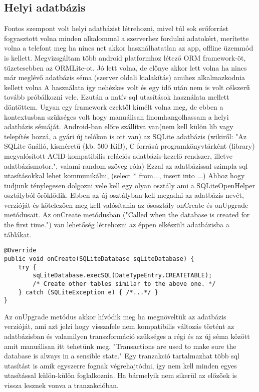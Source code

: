 \subsection*{Helyi adatbázis}
\label{localdatabase}
Fontos szempont volt helyi adatbázist létrehozni, mivel túl sok erőforrást fogyasztott volna minden alkalommal a szerverhez fordulni adatokért, merítette volna a telefont meg ha nincs net akkor használhatatlan az app, offline üzemmód is kellett. 
Megvizsgáltam több android platformhoz létező ORM framework-öt, tüzetesebben az ORMLite-ot. 
Jó lett volna, de előnye akkor lett volna ha nincs már meglévő adatbázis séma (szerver oldali kialakítás) amihez alkalmazkodnia kellett volna
A használata így nehézkes volt és egy idő után nem is volt célszerű tovább próbálkozni vele.
Ezután a natív sql utasítások használata mellett döntöttem. Ugyan egy framework ezektől kímélt volna meg, de ebben a kontextusban szükséges volt hogy manuálisan finomhangolhassam a helyi adatbázis sémáját.
Android-ban előre szállítva van(nem kell külön lib vagy telepítés hozzá, a gyári új telókon is ott van) az SQLite adatbázis (wikiről: "Az SQLite önálló, kisméretű (kb. 500 KiB), C forrású programkönyvtárként (library) megvalósított ACID-kompatibilis relációs adatbázis-kezelő rendszer, illetve adatbázismotor.", valami random szöveg róla)
Ezzal az adatbázissal szimpla sql utasításokkal lehet kommunikálni, (select * from..., insert into ...)
Ahhoz hogy tudjunk ténylegesen dolgozni vele kell egy olyan osztály ami a SQLiteOpenHelper osztályból öröklődik. Ebben az új osztályban kell megadni az adatbázis nevét, verzióját és kötelezően meg kell valósítania az ősosztály onCreate és onUpgrade metódusait.
Az onCreate metódusban ("Called when the database is created for the first time.") van lehetőség létrehozni az éppen elkészült adatbázisba a táblákat. 
\begin{lstlisting}
@Override
public void onCreate(SQLiteDatabase sqLiteDatabase) {
	try {
		sqLiteDatabase.execSQL(DateTypeEntry.CREATETABLE);
		/* Create other tables similar to the above one. */
	} catch (SQLiteException e) { /*...*/ }
}
\end{lstlisting}
Az onUpgrade metódus akkor hívódik meg ha megnöveltük az adatbázis verzióját, ami azt jelzi hogy visszafele nem kompatibilis változás történt az adatbázisban és valamilyen transzformáció szükséges a régi és az új séma között amit manuálisan itt tehetünk meg.
"Transactions are used to make sure the database is always in a sensible state." Egy tranzakció tartalmazhat több sql utasítást is amik egyszerre fognak végrehajtódni, így nem kell minden egyes utasítással külön-külön foglalkoznia. Ha bármelyik nem sikerül az előzőek is vissza lesznek vonva a tranzakcióban. 
